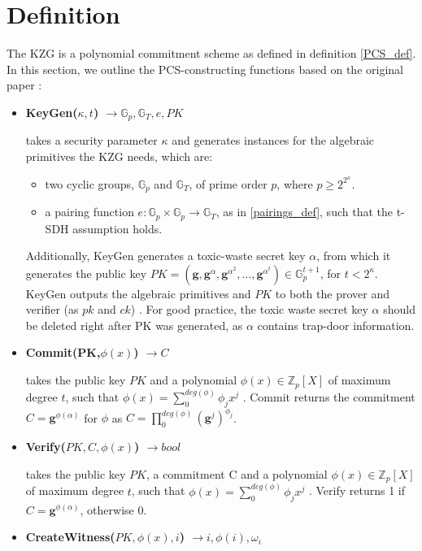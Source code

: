 \section{Definition}
The KZG is a polynomial commitment scheme as defined in definition \ref{PCS_def}. In this section, we outline the PCS-constructing functions based on the original paper \parencite{KZG}:
\begin{itemize}
    \item \textbf{KeyGen($\kappa,t$) $\rightarrow \mathbb{G}_p, \mathbb{G}_T, e, PK$} 
    
    takes a security parameter $\kappa$ and generates instances for the algebraic primitives the KZG needs, which are: 
    \begin{itemize}
        \item two cyclic groups, $\mathbb{G}_p$ and $\mathbb{G}_T$, of prime order $p$, where $p\ge2^{2^\kappa}$.
        \item a pairing function $e: \mathbb{G}_p \times \mathbb{G}_p \rightarrow \mathbb{G}_T$, as in \ref{pairings_def}, such that the t-SDH assumption holds.
    \end{itemize}
    \parencite{KZG}
    Additionally, KeyGen generates a toxic-waste secret key $\alpha$, from which it generates the public key $PK=(\mathbf{g}, \mathbf{g}^\alpha, \mathbf{g}^{\alpha^2},\dots,\mathbf{g}^{\alpha^t})\in \mathbb{G}_p^{t+1}$, for $t<2^\kappa$. KeyGen outputs the algebraic primitives and $PK$ to both the prover and verifier (as $pk$ and $ck$) \parencite{KZG}. 
    For good practice, the toxic waste secret key $\alpha$ should be deleted right after PK was generated, as $\alpha$ contains trap-door information. 
    \item \textbf{Commit(PK,$\phi(x)$) $\rightarrow C$}

    takes the public key $PK$ and a polynomial $\phi(x) \in \mathbb{Z}_p[X]$
    of maximum degree $t$, such that $\phi(x)=\sum_{0}^{deg(\phi)}\phi_jx^j$
    \parencite{KZG}. Commit returns the commitment $C=\mathbf{g}^{\phi(\alpha)}$ for $\phi$ as $C=\prod_{0}^{deg(\phi)}(\mathbf{g}^j)^{\phi_j}$\parencite{KZG}.
    \item \textbf{Verify($PK,C,\phi(x)$) $\rightarrow bool$}

    takes the public key $PK$, a commitment C and a polynomial $\phi(x) \in \mathbb{Z}_p[X]$ of maximum degree $t$, such that $\phi(x)=\sum_{0}^{deg(\phi)}\phi_jx^j$ \parencite{KZG}. Verify returns 1 if $C=\mathbf{g}^{\phi(\alpha)}$, otherwise 0.
    \item \textbf{CreateWitness($PK, \phi(x), i$) $\rightarrow i,\phi(i),\omega_i$ }


\end{itemize}
